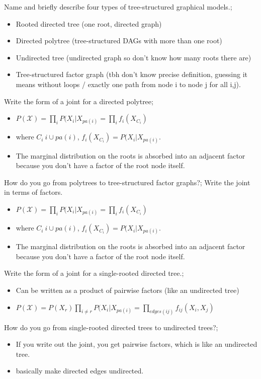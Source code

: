 \documentclass{article}
\begin{document}
Name and briefly describe four types of tree-structured graphical models.; \begin{itemize} \item Rooted directed tree (one root, directed graph) \item Directed polytree (tree-structured DAGs with more than one root) \item Undirected tree (undirected graph so don't know how many roots there are) \item Tree-structured factor graph (tbh don't know precise definition, guessing it means without loops / exactly one path from node i to node j for all i,j).  \end{itemize}

Write the form of a joint for a directed polytree; \begin{itemize} \item $P(\mathcal{X})=\prod_i P(X_i|X_{pa(i)} = \prod_i f_i(X_{C_i})$ \item where $C_i \ i\cup pa(i)$, $f_i(X_{C_i})=P(X_i|X_{pa(i)}$.  \item The marginal distribution on the roots is absorbed into an adjacent factor because you don't have a factor of the root node itself.  \end{itemize}

How do you go from polytrees to tree-structured factor graphs?; Write the joint in terms of factors. \begin{itemize} \item $P(\mathcal{X})=\prod_i P(X_i|X_{pa(i)} = \prod_i f_i(X_{C_i})$ \item where $C_i \ i\cup pa(i)$, $f_i(X_{C_i})=P(X_i|X_{pa(i)}$.  \item The marginal distribution on the roots is absorbed into an adjacent factor because you don't have a factor of the root node itself.  \end{itemize}

Write the form of a joint for a single-rooted directed tree.; \begin{itemize} \item Can be written as a product of pairwise factors (like an undirected tree) \item $P(\mathcal{X})=P(X_r)\prod_{i\ne r} P(X_i|X_{pa(i)} = \prod_{edges(ij)} f_{ij}(X_{i}, X_j)$ \end{itemize}

How do you go from single-rooted directed trees to undirected trees?; \begin{itemize} \item If you write out the joint, you get pairwise factors, which is like an undirected tree.  \item basically make directed edges undirected.  \end{itemize}
\end{document}
